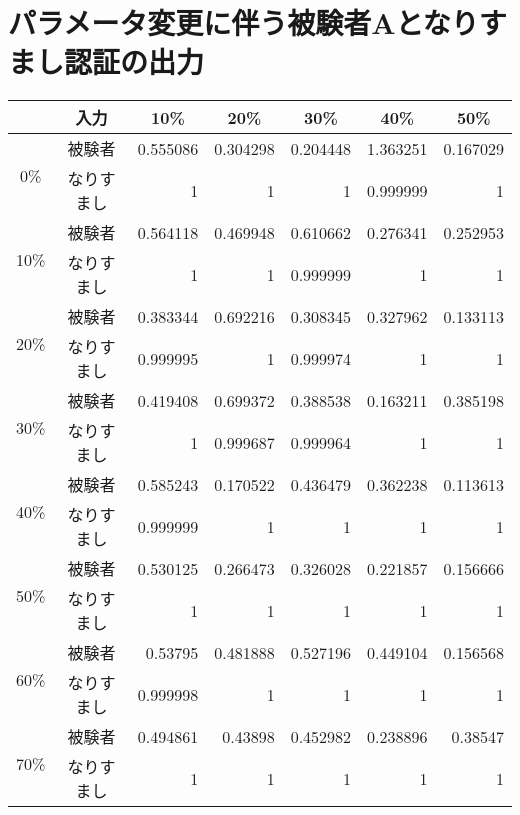 \section{パラメータ変更に伴う被験者Aとなりすまし認証の出力\label{tune-a}}
\begin{center}
  \begin{longtable}[btph]{|c|c|r|r|r|r|r|}
    \hline
      \multicolumn{1}{|c|}{} & \multicolumn{1}{c|}{入力} & \multicolumn{1}{c|}{10\%} & \multicolumn{1}{c|}{20\%} & \multicolumn{1}{c|}{30\%} & \multicolumn{1}{c|}{40\%} & \multicolumn{1}{c|}{50\%} \\ \hline
      \multirow{2}{*}{0\%}  & 被験者 & 0.555086 & 0.304298 & 0.204448 & 1.363251 & 0.167029 \\ \cline{2-7}
           & なりすまし & 1 & 1 & 1 & 0.999999 & 1 \\ \hline
      \multirow{2}{*}{10\%} & 被験者 & 0.564118 & 0.469948 & 0.610662 & 0.276341 & 0.252953 \\ \cline{2-7}
           & なりすまし & 1 & 1 & 0.999999 & 1 & 1 \\ \hline
      \multirow{2}{*}{20\%} & 被験者 & 0.383344 & 0.692216 & 0.308345 & 0.327962 & 0.133113 \\ \cline{2-7}
           & なりすまし & 0.999995 & 1 & 0.999974 & 1 & 1 \\ \hline
      \multirow{2}{*}{30\%} & 被験者 & 0.419408 & 0.699372 & 0.388538 & 0.163211 & 0.385198 \\ \cline{2-7}
           & なりすまし & 1 & 0.999687 & 0.999964 & 1 & 1 \\ \hline
      \multirow{2}{*}{40\%} & 被験者 & 0.585243 & 0.170522 & 0.436479 & 0.362238 & 0.113613 \\ \cline{2-7}
           & なりすまし & 0.999999 & 1 & 1 & 1 & 1 \\ \hline
      \multirow{2}{*}{50\%} & 被験者 & 0.530125 & 0.266473 & 0.326028 & 0.221857 & 0.156666 \\ \cline{2-7}
           & なりすまし & 1 & 1 & 1 & 1 & 1 \\ \hline
      \multirow{2}{*}{60\%} & 被験者 & 0.53795  & 0.481888 & 0.527196 & 0.449104 & 0.156568 \\ \cline{2-7}
           & なりすまし & 0.999998 & 1 & 1 & 1 & 1 \\ \hline
      \multirow{2}{*}{70\%} & 被験者 & 0.494861 & 0.43898  & 0.452982 & 0.238896 & 0.38547 \\ \cline{2-7}
           & なりすまし & 1 & 1 & 1 & 1 & 1 \\ \hline

\end{longtable}
\end{center}
